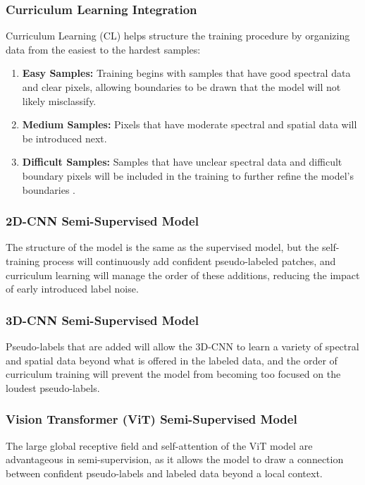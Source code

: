 \subsubsection{Curriculum Learning Integration}
Curriculum Learning (CL) helps structure the training procedure by organizing data from the easiest to the hardest samples:
\begin{enumerate}
    \item \textbf{Easy Samples:} Training begins with samples that have good spectral data and clear pixels, allowing boundaries to be drawn that the model will not likely misclassify.
    \item \textbf{Medium Samples:} Pixels that have moderate spectral and spatial data will be introduced next.
    \item \textbf{Difficult Samples:} Samples that have unclear spectral data and difficult boundary pixels will be included in the training to further refine the model’s boundaries \cite{bengio2009curriculum}.
\end{enumerate}

\subsubsection{2D-CNN Semi-Supervised Model}
The structure of the model is the same as the supervised model, but the self-training process will continuously add confident pseudo-labeled patches, and curriculum learning will manage the order of these additions, reducing the impact of early introduced label noise.

\subsubsection{3D-CNN Semi-Supervised Model}
Pseudo-labels that are added will allow the 3D-CNN to learn a variety of spectral and spatial data beyond what is offered in the labeled data, and the order of curriculum training will prevent the model from becoming too focused on the loudest pseudo-labels.

\subsubsection{Vision Transformer (ViT) Semi-Supervised Model}
The large global receptive field and self-attention of the ViT model are advantageous in semi-supervision, as it allows the model to draw a connection between confident pseudo-labels and labeled data beyond a local context.

